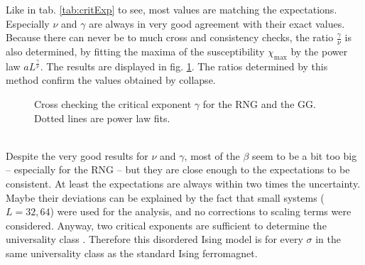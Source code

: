     Like in tab. \ref{tab:critExp} to see, most values
    are matching the expectations. Especially \(\nu\) and \(\gamma\)
    are always in very good agreement with their exact values. Because
    there can never be to much cross and consistency checks, the ratio
    \(\frac{\gamma}{\nu}\) is also determined, by fitting the maxima of
    the susceptibility \(\chi_{\mathrm{max}}\) by the power law \(aL^\frac{\gamma}{\nu}\).
    The results are displayed in fig. \ref{fig:susCrossCheck}. The ratios
    determined by this method confirm the values obtained by collapse.
    \begin{figure}[htbp]
        \centering
        \caption[Alternative Way Determining $\gamma$]
        {
            Cross checking the critical exponent $\gamma$ for
                 the RNG and
                 the GG.
            Dotted lines are power law fits.
        }
        \label{fig:susCrossCheck}
    \end{figure}\\
    Despite the very good results for \(\nu\) and \(\gamma\), most of the
    \(\beta\) seem to be a bit too big -- especially for the RNG -- but
    they are close enough to the expectations to be consistent. At least
    the expectations are always within two times the uncertainty.
    Maybe their deviations can be explained by the fact that small
    systems (\(L=32,64\)) were used for the analysis, and no corrections
    to scaling terms were considered.
    Anyway, two critical exponents are sufficient to determine the
    universality class \cite[p. 145]{Katzgraber2011}. Therefore this
    disordered Ising model is for every \(\sigma\) in the same universality
    class as the standard Ising ferromagnet.

